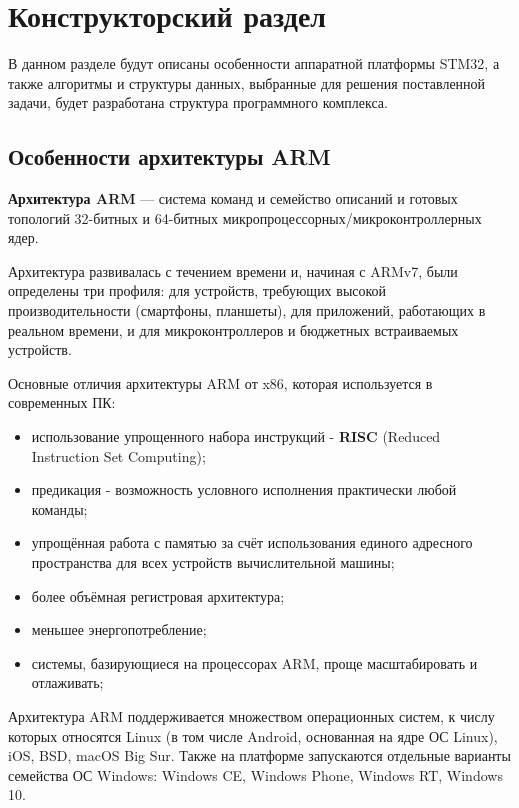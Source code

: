 \chapter{Конструкторский раздел}
\label{cha:design}

В данном разделе будут описаны особенности аппаратной платформы STM32, а также алгоритмы и структуры данных, выбранные для решения 
поставленной задачи, будет разработана структура программного комплекса.

\section{Особенности архитектуры ARM}

\textbf{Архитектура ARM} — система команд и семейство описаний и готовых топологий 32-битных и 64-битных микропроцессорных/микроконтроллерных ядер.

Архитектура развивалась с течением времени и, начиная с ARMv7, были определены три профиля: для устройств, требующих высокой производительности (смартфоны, планшеты), для приложений, работающих в реальном времени, и для микроконтроллеров и бюджетных встраиваемых устройств. \cite{ARM_dev_doc}

Основные отличия архитектуры ARM от x86, которая используется в современных ПК: \cite{ARM_vs_x86}
\begin{itemize}
	\item использование упрощенного набора инструкций - \textbf{RISC} (Reduced Instruction Set Computing);
	\item предикация - возможность условного исполнения практически любой команды;
	\item упрощённая работа с памятью за счёт использования единого адресного пространства для всех устройств вычислительной машины;
	\item более объёмная регистровая архитектура; \cite{ARM_registers} \cite{x86_registers}
	\item меньшее энергопотребление;
	\item системы, базирующиеся на процессорах ARM, проще масштабировать и отлаживать;
\end{itemize}

Архитектура ARM поддерживается множеством операционных систем, к числу которых относятся Linux (в том числе Android, основанная на ядре ОС Linux), iOS, BSD, macOS Big Sur. Также на платформе запускаются отдельные варианты семейства ОС Windows: Windows CE, Windows Phone, Windows RT, Windows 10.

